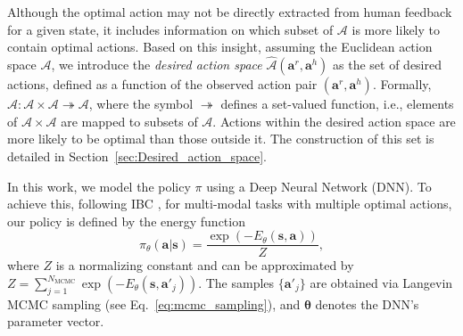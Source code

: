 Although the optimal action may not be directly extracted from human feedback for a given state, it includes information on which subset of $\mathcal{A}$ is more likely to contain optimal actions. 
Based on this insight, assuming the Euclidean action space $\mathcal{A}$, we introduce the \textit{desired action space} $\hat{\mathcal{A}}(\bm a^r, \bm a^h)$ as the set of desired actions, defined as a function of the observed action pair $(\bm a^r, \bm a^h)$.
Formally, ${\hat{\mathcal{A}}:\mathcal{A} \times \mathcal{A} \twoheadrightarrow\mathcal{A}}$, where the symbol $\twoheadrightarrow$ defines a set-valued function, i.e., elements of $\mathcal{A} \times \mathcal{A} $ are mapped to subsets of $\mathcal{A}$.
Actions within the desired action space are more likely to be optimal than those outside it. The construction of this set is detailed in Section~\ref{sec:Desired_action_space}.  


In this work, we model the policy $\pi$ using a Deep Neural Network (DNN). 
To achieve this, following IBC \cite{2022_implicit_BC}, for multi-modal tasks with multiple optimal actions, our policy is defined by the energy function 
\[\pi_{\theta}(\bm a | \bm s) = \frac{\exp(-E_{\theta}(\bm s, \bm a))}{Z},
\]
where $Z$ is a normalizing constant and can be approximated by $Z = \sum_{j=1}^{N_{\text{MCMC}}} \exp(-E_{\theta}(\bm s, \bm a'_j))  $.
The samples $\{\bm a'_j\}$ are obtained via Langevin MCMC sampling (see Eq.~\eqref{eq:mcmc_sampling}), and $\bm \theta$ denotes the DNN's parameter vector.

